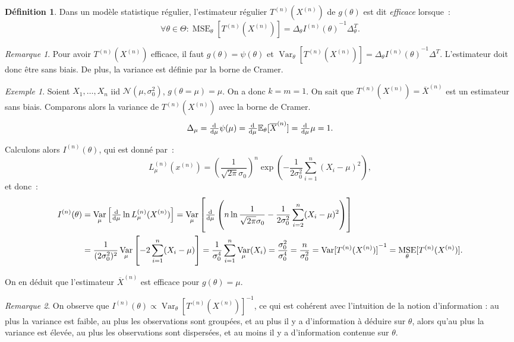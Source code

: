 \documentclass{report}
\DeclareMathOperator{\Var}{Var}
\DeclareMathOperator{\MSE}{MSE}
\newcommand{\E}{\mathbb E}
\newcommand{\n}{{(n)}}
\newcommand{\Xn}{{X^\n}}
\newcommand{\Tn}{{T^\n}}
\newcommand{\TnXn}{{\Tn(\Xn)}}
\theoremstyle{definition}
\newtheorem{déf}[thm]{Définition}
\theoremstyle{remark}
\newtheorem*{rmq}{Remarque}
\newtheorem{ex}{Exemple}[chapter]
\begin{document}
			\begin{déf} Dans un modèle statistique régulier, l'estimateur régulier $\TnXn$ de $g(\theta)$ est dit \textit{efficace} lorsque~:
			\[\forall \theta \in \Theta : \MSE_\theta[\TnXn] = \Delta_\theta{I^{(n)}(\theta)}^{-1}\Delta_\theta^T.\]
			\end{déf}

			\begin{rmq} Pour avoir $\TnXn$ efficace, il faut $g(\theta) = \psi(\theta)$ et $\Var_\theta[\TnXn] = \Delta_\theta{I^{(n)}(\theta)}^{-1}\Delta^T$.
			L'estimateur doit donc être sans biais. De plus, la variance est définie par la borne de Cramer.
			\end{rmq}

			\begin{ex} Soient $X_1, \ldots, X_n$ iid $\mathcal N(\mu, \sigma_0^2)$, $g(\theta = \mu) = \mu$. On a donc $k=m=1$. On sait que $\TnXn = \overline X^{(n)}$
			est un estimateur sans biais. Comparons alors la variance de $\TnXn$ avec la borne de Cramer.
			\[\Delta_\mu = \od {}\mu \psi(\mu) = \od {}\mu\E_\theta[\overline X^{(n)}] = \od {}\mu\mu = 1.\]

			Calculons alors $I^{(n)}(\theta)$, qui est donné par~:
			\[L_\mu^{(n)}(x^{(n)}) = \left(\frac 1{\sqrt {2\pi}\sigma_0}\right)^n\exp\left(-\frac 1{2\sigma_0^2}\sum_{i=1}^n(X_i-\mu)^2\right),\]
			et donc~:
			\begin{align*}
				I^{(n)}(\theta) &= \Var_\mu\left[\od {}\mu \ln L_\mu^{(n)}(X^{(n)})\right]
					= \Var_\mu\left[\od {}\mu\left(n\ln \frac 1{\sqrt {2\pi}\sigma_0} - \frac 1{2\sigma_0^2}\sum_{i=2}^n(X_i-\mu)^2\right)\right] \\
				&=\frac 1{(2\sigma_0^2)^2}\Var_\mu\left[-2\sum_{i=1}^n(X_i-\mu)\right] = \frac 1{\sigma_0^4}\sum_{i=1}^n\Var_\mu(X_i)
					= \frac {\sigma_0^2}{\sigma_0^4} = \frac n{\sigma_0^2} = {\Var[\TnXn]}^{-1} = \MSE_\theta[\TnXn].
			\end{align*}

			On en déduit que l'estimateur $\overline X^{(n)}$ est efficace pour $g(\theta) = \mu$.
			\end{ex}

			\begin{rmq} On observe que $I^{(n)}(\theta) \propto {\Var_\theta[\TnXn]}^{-1}$, ce qui est cohérent avec l'intuition de la notion d'information : au plus
			la variance est faible, au plus les observations sont groupées, et au plus il y a d'information à déduire sur $\theta$, alors qu'au plus la variance est
			élevée, au plus les observations sont dispersées, et au moins il y a d'information contenue sur $\theta$.
			\end{rmq}
\end{document}
